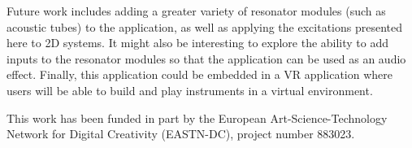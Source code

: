 \documentclass{article}
\begin{document}
Future work includes adding a greater variety of resonator modules (such as acoustic tubes) to the application, as well as applying the excitations presented here to 2D systems. It might also be interesting to explore the ability to add inputs to the resonator modules so that the application can be used as an audio effect. 
Finally, this application could be embedded in a VR application where users will be able to build and play instruments in a virtual environment. 

\begin{acknowledgments}
This work has been funded in part by the European Art-Science-Technology Network for Digital Creativity (EASTN-DC), project number 883023.
\end{acknowledgments} 

{\small

}
\end{document}
